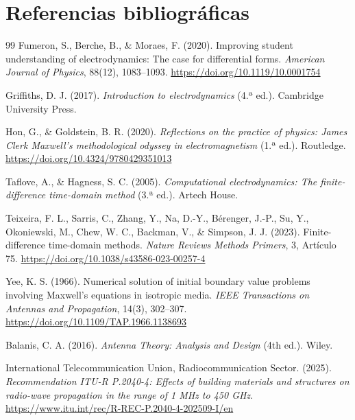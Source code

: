 \vspace{-1em}
\section{Referencias bibliográficas}

\begingroup
\renewcommand{\bibsection}{}
\begin{thebibliography}{99}
Fumeron, S., Berche, B., \& Moraes, F. (2020). Improving student understanding of electrodynamics: The case for differential forms. \textit{American Journal of Physics}, 88(12), 1083--1093. \url{https://doi.org/10.1119/10.0001754}

Griffiths, D. J. (2017). \textit{Introduction to electrodynamics} (4.ª ed.). Cambridge University Press.

Hon, G., \& Goldstein, B. R. (2020). \textit{Reflections on the practice of physics: James Clerk Maxwell’s methodological odyssey in electromagnetism} (1.ª ed.). Routledge. \url{https://doi.org/10.4324/9780429351013}

Taflove, A., \& Hagness, S. C. (2005). \textit{Computational electrodynamics: The finite-difference time-domain method} (3.ª ed.). Artech House.

Teixeira, F. L., Sarris, C., Zhang, Y., Na, D.-Y., Bérenger, J.-P., Su, Y., Okoniewski, M., Chew, W. C., Backman, V., \& Simpson, J. J. (2023). Finite-difference time-domain methods. \textit{Nature Reviews Methods Primers}, 3, Artículo 75. \url{https://doi.org/10.1038/s43586-023-00257-4}

Yee, K. S. (1966). Numerical solution of initial boundary value problems involving Maxwell’s equations in isotropic media. \textit{IEEE Transactions on Antennas and Propagation}, 14(3), 302--307. \url{https://doi.org/10.1109/TAP.1966.1138693}

Balanis, C. A. (2016). \textit{Antenna Theory: Analysis and Design} (4th ed.). Wiley.

International Telecommunication Union, Radiocommunication Sector. (2025). \textit{Recommendation ITU-R P.2040-4: Effects of building materials and structures on radio-wave propagation in the range of 1 MHz to 450 GHz}. \url{https://www.itu.int/rec/R-REC-P.2040-4-202509-I/en}


\end{thebibliography}
